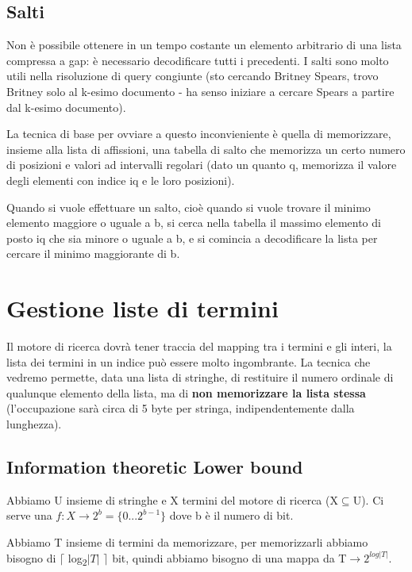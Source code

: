\documentclass[12pt,italian]{report}
\begin{document}
\section{Salti}
\label{salti}
Non è possibile ottenere in un tempo costante un elemento arbitrario di una lista compressa a gap: è necessario decodificare tutti i precedenti. I salti sono molto utili nella risoluzione di query congiunte (sto cercando Britney Spears, trovo Britney solo al k-esimo documento - ha senso iniziare a cercare Spears a partire dal k-esimo documento).

La tecnica di base per ovviare a questo inconvieniente è quella di memorizzare, insieme alla lista di affissioni, una tabella di salto che memorizza un certo numero di posizioni e valori ad intervalli regolari (dato un quanto q, memorizza il valore degli elementi con indice iq e le loro posizioni).

Quando si vuole effettuare un salto, cioè quando si vuole trovare il minimo elemento maggiore o uguale a b, si cerca nella tabella il massimo elemento di posto iq che sia minore o uguale a b, e si comincia a decodificare la lista per cercare il minimo maggiorante di b.

\chapter{Gestione liste di termini}
\label{gestionelistetermini}

Il motore di ricerca dovrà tener traccia del mapping tra i termini e gli interi, la lista dei termini in un indice può essere molto ingombrante. La tecnica che vedremo permette, data una lista di stringhe, di restituire il numero ordinale di qualunque elemento della lista, ma di \textbf{non memorizzare la lista stessa} (l'occupazione sarà circa di 5 byte per stringa, indipendentemente dalla lunghezza).

\section{Information theoretic Lower bound}
\label{lowerbound}

\noindent Abbiamo U insieme di stringhe e X termini del motore di ricerca (X$\subseteq$U). Ci serve una $f: X\to2^b = \{0...2^{b-1}\}$ dove b è il numero di bit.

\noindent Abbiamo T insieme di termini da memorizzare, per memorizzarli abbiamo bisogno di $\lceil$ log\textsubscript{2}$|T|$ $\rceil$ bit, quindi abbiamo bisogno di una mappa da T$\to 2^{log|T|}$.
\end{document}
